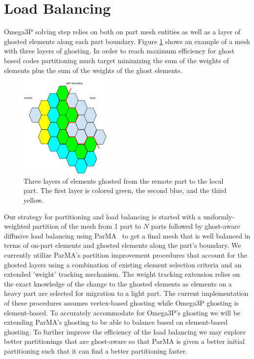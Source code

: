 \documentclass[a4paper]{article}
\begin{document}
\section{Load Balancing}

Omega3P solving step relies on both on part mesh entities as well as a layer of 
ghosted elements along each part boundary. Figure \ref{fig:ghost3} shows an 
example of a mesh with three layers of ghosting. In order to reach maximum efficiency
for ghost based codes partitioning much target minimizing the sum of the 
weights of elements plus the sum of the weights of the ghost elements. 

\begin{figure}[ht]
\centering
\includegraphics[width=0.4\textwidth]{ghostingExample.eps} 
\caption{\label{fig:ghost3} Three layers of elements ghosted from the remote part to the local part.  The first layer is colored green, the second blue, and the third yellow.}
\end{figure}

\noindent Our strategy for partitioning and load balancing is started with a 
uniformly-weighted 
partition of the mesh from 1 part to $N$ parts followed by ghost-aware diffusive load 
balancing using ParMA~\cite{SmithParma2015} to get a final mesh that is well balanced 
in terms of on-part elements and ghosted elements along the part's boundary. We 
currently utilize ParMA's partition improvement procedures that account for the 
ghosted layers using a combination of existing element selection criteria and an 
extended 'weight' tracking mechanism.  The weight tracking extension relies on the 
exact knowledge of the change to the ghosted elements as elements on a heavy part 
are selected for migration to a light part. The current implementation of these 
procedures assumes vertex-based ghosting while Omega3P ghosting is element-based. 
To accurately accommodate for Omega3P's ghosting we will be extending ParMA's 
ghosting to be able to balance based on element-based ghosting. To further improve 
the efficiency of the load balancing we may explore better partitionings 
that are ghost-aware so that ParMA is given a better initial partitioning such that it 
can find a better partitioning faster.
\end{document}
